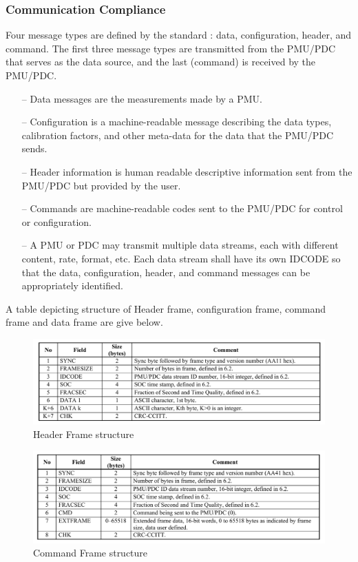 \subsubsection{Communication Compliance}
Four  message  types  are  defined  by the standard \cite{c37.118.2}:  data, configuration, header,  and  command.  The  first  three  message  types are transmitted from the PMU/PDC that serves as the data source, and the last (command) is received by the PMU/PDC.
\begin{itemize}
	\item[--] Data messages are the measurements made by a PMU.
	\item[--] Configuration  is  a  machine-readable  message  describing  the  data  types,  calibration  factors,  and  other meta-data for the data that the PMU/PDC sends.
	\item[--] Header  information  is  human  readable  descriptive  information  sent  from  the  PMU/PDC  but provided by the user.  
	\item[--] Commands are machine-readable codes sent to the PMU/PDC for control or configuration.  
	\item[--] A PMU or PDC may transmit multiple data streams,	each with different content, rate, format, etc. Each data stream shall have its own IDCODE so that the data, configuration, header, and command messages  can  be  appropriately  identified. 
\end{itemize}

A table depicting structure of Header frame, configuration frame, command frame and data frame are give below.

\begin{figure}
	\includegraphics[width=\textwidth]{fig/hdr_frame.png}
	\caption{Header Frame structure \cite{c37.118.2}}
\end{figure}

\begin{figure}
	\includegraphics[width=\textwidth]{fig/cmd_frame.png}
	\caption{Command Frame structure \cite{c37.118.2}}
	\end{figure}

